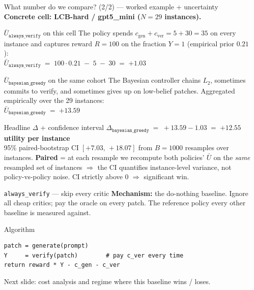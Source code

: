 \documentclass[10pt]{beamer}
\newcommand{\good}[1]{\textcolor{accentGreen}{\textbf{#1}}}
\newcommand{\info}[1]{\textcolor{primaryBlue}{\textbf{#1}}}
\begin{document}
\begin{frame}{What number do we compare? (2/2) --- worked example + uncertainty}
\info{Concrete cell: LCB-hard / gpt5\_mini ($N{=}29$ instances).}

\begin{block}{$\bar{U}_{\texttt{always\_verify}}$ on this cell}
\footnotesize
The policy spends $c_\text{gen} + c_\text{ver} = 5 + 30 = 35$ on every
instance and captures reward $R = 100$ on the fraction $Y{=}1$
(empirical prior $0.21$):\\[3pt]
\centering
$\bar{U}_{\texttt{always\_verify}} \;=\; 100 \cdot 0.21 \;-\; 5 \;-\; 30 \;=\; \mathbf{+1.03}$
\end{block}

\begin{block}{$\bar{U}_{\texttt{bayesian\_greedy}}$ on the same cohort}
\footnotesize
The Bayesian controller chains $L_2$, sometimes commits to verify, and
sometimes gives up on low-belief patches. Aggregated empirically over the
29 instances:\\[3pt]
\centering
$\bar{U}_{\texttt{bayesian\_greedy}} \;=\; \mathbf{+13.59}$
\end{block}

\begin{exampleblock}{Headline $\Delta$ + confidence interval}
\good{$\Delta_{\texttt{bayesian\_greedy}} \;=\; +13.59 - 1.03 \;=\; \mathbf{+12.55}$ utility per instance}\\[2pt]
\footnotesize
95\% paired-bootstrap CI $[+7.03,\, +18.07]$ from $B{=}1000$ resamples over
instances. \textbf{Paired} = at each resample we recompute both policies'
$\bar{U}$ on the \emph{same} resampled set of instances $\Rightarrow$ the
CI quantifies instance-level variance, not policy-vs-policy noise. CI
strictly above $0$ $\Rightarrow$ significant win.
\end{exampleblock}
\end{frame}


\begin{frame}[fragile]{\texttt{always\_verify} --- skip every critic}
\info{Mechanism:} the do-nothing baseline. Ignore all cheap critics; pay the
oracle on every patch. The reference policy every other baseline is measured
against.

\begin{block}{Algorithm}
\begin{lstlisting}
patch = generate(prompt)
Y     = verify(patch)        # pay c_ver every time
return reward * Y - c_gen - c_ver
\end{lstlisting}
\end{block}

\textcolor{softGrey}{\scriptsize Next slide: cost analysis and regime where
this baseline wins / loses.}
\end{frame}
\end{document}
